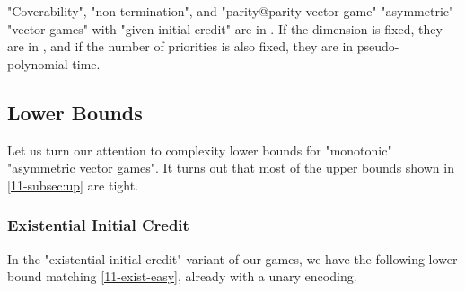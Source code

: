 \begin{theorem}\label{11-avag-easy}
  "Coverability", "non-termination", and "parity@parity vector game"
  "asymmetric" "vector games" with "given initial credit" are in
  \kEXP[2].  If the dimension is fixed, they are in \EXP, and if the
  number of priorities is also fixed, they are in pseudo-polynomial
  time.
\end{theorem}


\subsection{Lower Bounds}
\label{11-subsec:low}
Let us turn our attention to complexity lower bounds for "monotonic"
"asymmetric vector games".  It turns out that most of the upper bounds
shown in \cref{11-subsec:up} are tight.
%
\subsubsection{Existential Initial Credit}
In the "existential initial credit" variant of our games, we have the
following lower bound matching \cref{11-exist-easy}, already with a
unary encoding.

